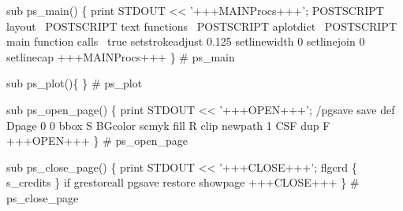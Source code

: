 \documentclass[11pt]{article}
\def\nwendcode{\endtrivlist \endgroup} %
\let\nwdocspar=\par                    %
\begin{document}


\nwenddocs{}\endmoddef
sub ps_main() \{
    print STDOUT << '+++MAINProcs+++';
\LA{}POSTSCRIPT layout~{\nwtagstyle{}}\RA{}
\LA{}POSTSCRIPT text functions~{\nwtagstyle{}}\RA{}
\LA{}POSTSCRIPT aplotdict~{\nwtagstyle{}}\RA{}
\LA{}POSTSCRIPT main function calls~{\nwtagstyle{}}\RA{}
%
%
%
true setstrokeadjust
0.125 setlinewidth
0 setlinejoin
0 setlinecap
%
%
+++MAINProcs+++
\} # ps_main
\nwendcode{}\nwdocspar


\nwenddocs{}\endmoddef
sub ps_plot()\{
\} # ps_plot
\nwendcode{}\nwdocspar



\nwenddocs{}\endmoddef
sub ps_open_page() \{
    print STDOUT << '+++OPEN+++';
%
/pgsave save def
Dpage 0 0 bbox S BGcolor scmyk fill R clip newpath
1 CSF dup F
%
+++OPEN+++
\} # ps_open_page
\nwendcode{}\nwdocspar

\nwenddocs{}\endmoddef
sub ps_close_page() \{
    print STDOUT << '+++CLOSE+++';
%
flgcrd \{ s_credits \} if
grestoreall
pgsave restore
showpage
%
%
+++CLOSE+++
\} # ps_close_page
\nwendcode{}\nwdocspar
\end{document}
